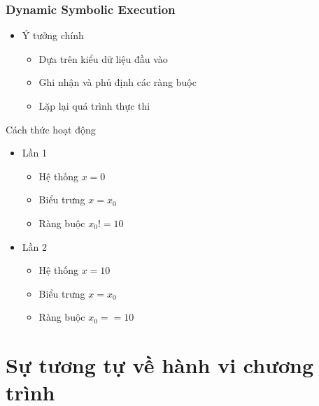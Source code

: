 \documentclass{beamer}
\begin{document}
\begin{frame}
  \frametitle{Dynamic Symbolic Execution}
  \begin{itemize}
  \item Ý tưởng chính
    \begin{itemize}
    \item Dựa trên kiểu dữ liệu đầu vào
    \item Ghi nhận và phủ định các ràng buộc
    \item Lặp lại quá trình thực thi
    \end{itemize}
  \end{itemize}

  \begin{block}{Cách thức hoạt động}
    \begin{minipage}{0.45\linewidth}
      
    \end{minipage}
    \hfill
    \begin{minipage}{0.50\linewidth}
      \begin{itemize}
      \item Lần 1
        \begin{itemize}
        \item Hệ thống $ x = 0 $
        \item Biểu trưng $ x = x_{0} $
        \item Ràng buộc $ x_{0} != 10 $
        \end{itemize}
      \item Lần 2
        \begin{itemize}
        \item Hệ thống $ x = 10 $
        \item Biểu trưng $ x = x_{0} $
        \item Ràng buộc $ x_{0} == 10 $
        \end{itemize}
      \end{itemize}
    \end{minipage}
  \end{block}
	
\end{frame}

\section{Sự tương tự về hành vi chương trình}
\end{document}
